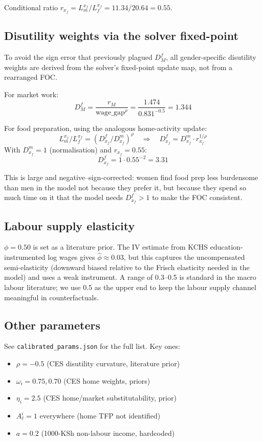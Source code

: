 \documentclass[11pt,a4paper]{article}
\begin{document}
Conditional ratio $r_{x_f} = L^{x_f}_m / L^{x_f}_f = 11.34 / 20.64 = 0.55$.

\subsection{Disutility weights via the solver fixed-point}

To avoid the sign error that previously plagued $D^f_M$, all
gender-specific disutility weights are derived from the solver's
fixed-point update map, not from a rearranged FOC.

For market work:
\[
  D^f_M = \frac{r_M}{\text{wage\_gap}^\rho}
  = \frac{1.474}{0.831^{-0.5}} = 1.344
\]

For food preparation, using the analogous home-activity update:
\[
  L^{x_f}_m / L^{x_f}_f = (D^f_{x_f} / D^m_{x_f})^\rho
  \quad\Rightarrow\quad
  D^f_{x_f} = D^m_{x_f} \cdot r_{x_f}^{1/\rho}
\]
With $D^m_{x_f} = 1$ (normalisation) and $r_{x_f} = 0.55$:
\[
  D^f_{x_f} = 1 \cdot 0.55^{-2} = 3.31
\]

This is large and negative--sign-corrected: women find food prep less
burdensome than men in the model not because they prefer it, but because
they spend so much time on it that the model needs $D^f_{x_f} > 1$ to
make the FOC consistent.

\subsection{Labour supply elasticity}

$\phi = 0.50$ is set as a literature prior. The IV estimate from KCHS
education-instrumented log wages gives $\hat\phi \approx 0.03$, but this
captures the uncompensated semi-elasticity (downward biased relative to
the Frisch elasticity needed in the model) and uses a weak instrument.
A range of 0.3--0.5 is standard in the macro labour literature; we use
0.5 as the upper end to keep the labour supply channel meaningful in
counterfactuals.

\subsection{Other parameters}

See \texttt{calibrated\_params.json} for the full list. Key ones:
\begin{itemize}[noitemsep]
  \item $\rho = -0.5$ (CES disutility curvature, literature prior)
  \item $\omega_i = 0.75, 0.70$ (CES home weights, priors)
  \item $\eta_i = 2.5$ (CES home/market substitutability, prior)
  \item $A^i_\ell = 1$ everywhere (home TFP not identified)
  \item $a = 0.2$ (1000-KSh non-labour income, hardcoded)
\end{itemize}
\end{document}
